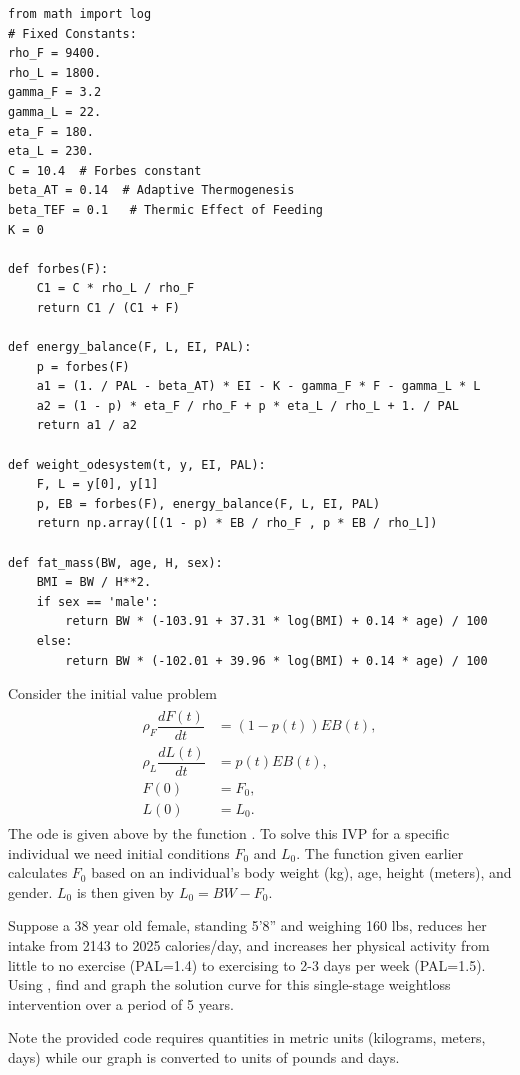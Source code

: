 \begin{lstlisting}
from math import log
# Fixed Constants:
rho_F = 9400.
rho_L = 1800.
gamma_F = 3.2
gamma_L = 22.
eta_F = 180.
eta_L = 230.
C = 10.4  # Forbes constant
beta_AT = 0.14  # Adaptive Thermogenesis
beta_TEF = 0.1   # Thermic Effect of Feeding
K = 0

def forbes(F):
    C1 = C * rho_L / rho_F
    return C1 / (C1 + F)

def energy_balance(F, L, EI, PAL):
    p = forbes(F)
    a1 = (1. / PAL - beta_AT) * EI - K - gamma_F * F - gamma_L * L
    a2 = (1 - p) * eta_F / rho_F + p * eta_L / rho_L + 1. / PAL
    return a1 / a2

def weight_odesystem(t, y, EI, PAL):
    F, L = y[0], y[1]
    p, EB = forbes(F), energy_balance(F, L, EI, PAL)
    return np.array([(1 - p) * EB / rho_F , p * EB / rho_L])

def fat_mass(BW, age, H, sex):
    BMI = BW / H**2.
    if sex == 'male':
        return BW * (-103.91 + 37.31 * log(BMI) + 0.14 * age) / 100
    else:
        return BW * (-102.01 + 39.96 * log(BMI) + 0.14 * age) / 100

\end{lstlisting}

\begin{problem}
Consider the initial value problem
\begin{align}
	\begin{split}
\rho_F \dfrac{dF(t)}{dt} &= (1-p(t)) EB(t),\\
\rho_L \dfrac{dL(t)}{dt} &= p(t) EB(t),\\
F(0) &= F_0, \\
L(0) &= L_0.
	\end{split}\label{eqn:weight_prob1}
\end{align}
The ode is given above by the function .
To solve this IVP for a specific individual we need initial conditions $F_0$ and $L_0.$
The function  given earlier calculates $F_0$ based on an individual's body weight (kg), age, height (meters), and gender.
$L_0$ is then given by $L_0 = BW - F_0$.

Suppose a 38 year old female, standing 5'8'' and weighing 160 lbs, reduces her intake from 2143 to 2025 calories/day, and increases her physical activity from little to no exercise (PAL=1.4) to exercising to 2-3 days per week (PAL=1.5).
Using , find and graph the solution curve for this single-stage weightloss intervention over a period of 5 years.

Note the provided code requires quantities in metric units (kilograms, meters, days) while our graph is converted to units of pounds and days.
\end{problem}

